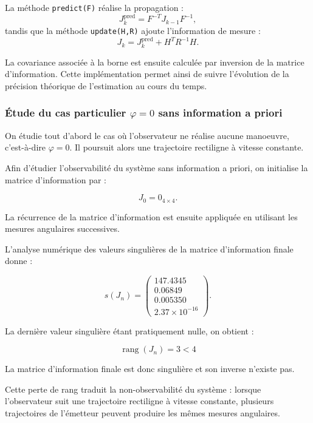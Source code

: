 \documentclass[12pt,a4paper]{article}
\begin{document}
La méthode \texttt{predict(F)} réalise la propagation :
\begin{equation}
J_k^{\mathrm{pred}}=F^{-T}J_{k-1}F^{-1},
\end{equation}
tandis que la méthode \texttt{update(H,R)} ajoute l'information de mesure :
\begin{equation}
J_k=J_k^{\mathrm{pred}}+H^TR^{-1}H.
\end{equation}

La covariance associée à la borne est ensuite calculée par inversion de la matrice d'information. Cette implémentation permet ainsi de suivre l'évolution de la précision théorique de l'estimation au cours du temps.



\subsubsection{Étude du cas particulier $\varphi=0$ sans information a priori}

On étudie tout d'abord le cas où l'observateur
ne réalise aucune manoeuvre, c'est-à-dire
$\varphi=0$. Il poursuit alors une trajectoire
rectiligne à vitesse constante.

Afin d'étudier l'observabilité du système sans
information a priori, on initialise la matrice
d'information par :

\[
J_0=0_{4\times4}.
\]

La récurrence de la matrice d'information est
ensuite appliquée en utilisant les mesures
angulaires successives.

L'analyse numérique des valeurs singulières
de la matrice d'information finale donne :

\[
s(J_n)=
\begin{pmatrix}
147.4345\\
0.06849\\
0.005350\\
2.37\times10^{-16}
\end{pmatrix}.
\]

La dernière valeur singulière étant pratiquement
nulle, on obtient :

\[
\boxed{\operatorname{rang}(J_n)=3<4}
\]

La matrice d'information finale est donc
singulière et son inverse n'existe pas.

Cette perte de rang traduit la non-observabilité
du système : lorsque l'observateur suit une
trajectoire rectiligne à vitesse constante,
plusieurs trajectoires de l'émetteur peuvent
produire les mêmes mesures angulaires.
\end{document}
